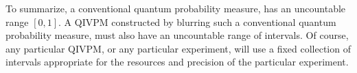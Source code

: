 \documentclass[english,reprint, aps, prl,superscriptaddress, showpacs,
showkeys, longbibliography, amsmath, amssymb, floatfix]{revtex4-1}
\theoremstyle{plain}
\theoremstyle{definition}
\newcommand{\imposs}{{\text{\wesa{impossible}}}}
\newcommand{\necess}{{\text{\wesa{certain}}}}
\newcommand{\proj}[1]{\op{#1}{#1}}
\newcommand{\ultramodular}{\mathcal{M}}
\newcommand{\muB}{\ensuremath{\mu^{B}}}
\newcommand{\gerardo}[1]{\fbox{\begin{minipage}{0.9\linewidth}\color{OliveGreen}{Gerardo says: #1}\end{minipage}}}
\begin{document}
To summarize, a conventional quantum probability measure, has an
uncountable range $[0,1]$. A QIVPM constructed by blurring such a
conventional quantum probability measure, must also have an uncountable
range of intervals. Of course, any particular QIVPM, or any particular
experiment, will use a fixed collection of intervals appropriate for
the resources and precision of the particular experiment. 
\gerardo{We need to explain physically what it means?}
\end{document}
